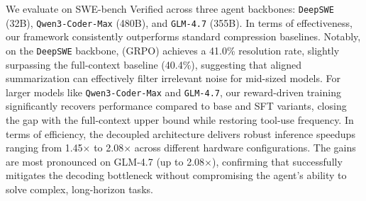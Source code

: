 We evaluate \model on SWE-bench Verified across three agent backbones: \texttt{DeepSWE} (32B), \texttt{Qwen3-Coder-Max} (480B), and \texttt{GLM-4.7} (355B). In terms of effectiveness, our framework consistently outperforms standard compression baselines. Notably, on the \texttt{DeepSWE} backbone, \model (GRPO) achieves a 41.0\% resolution rate, slightly surpassing the full-context baseline (40.4\%), suggesting that aligned summarization can effectively filter irrelevant noise for mid-sized models. For larger models like \texttt{Qwen3-Coder-Max} and \texttt{GLM-4.7}, our reward-driven training significantly recovers performance compared to base and SFT variants, closing the gap with the full-context upper bound while restoring tool-use frequency. In terms of efficiency, the decoupled architecture delivers robust inference speedups ranging from 1.45$\times$ to 2.08$\times$ across different hardware configurations. The gains are most pronounced on GLM-4.7 (up to 2.08$\times$), confirming that \model successfully mitigates the decoding bottleneck without compromising the agent's ability to solve complex, long-horizon tasks.